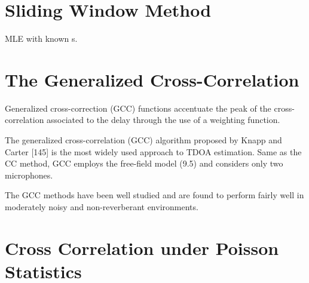 \section{Sliding Window Method}\label{sec:sliding}
MLE with known s.


\section{The Generalized Cross-Correlation}

Generalized cross-correction (GCC) functions accentuate the peak of the cross-correlation associated to the delay through the use of a weighting function.

The generalized cross-correlation (GCC) algorithm proposed by Knapp and
Carter [145] is the most widely used approach to TDOA estimation. Same as
the CC method, GCC employs the free-field model (9.5) and considers only
two microphones.

The GCC methods have been well studied and
are found to perform fairly well in moderately noisy and non-reverberant environments.

\section{Cross Correlation under Poisson Statistics}\label{sec:Poissonstats}

